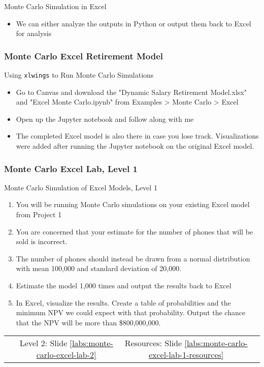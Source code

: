 \documentclass[handout, 11pt]{beamer}
\begin{document}
\begin{section}[Excel MC]{Monte Carlo Simulation in Excel}
\begin{frame}
\begin{itemize}
\item We can either analyze the outputs in Python or output them back to Excel for analysis
\end{itemize}
\end{frame}
\begin{frame}
\frametitle{Monte Carlo Excel Retirement Model}
{
\begin{block}{Using \texttt{xlwings} to Run Monte Carlo Simulations}
\begin{itemize}
\item Go to Canvas and download the "Dynamic Salary Retirement Model.xlsx" and "Excel Monte Carlo.ipynb" from Examples > Monte Carlo > Excel
\item Open up the Jupyter notebook and follow along with me
\item The completed Excel model is also there in case you lose track. Visualizations were added after running the Jupyter notebook on the original Excel model.
\end{itemize}
\end{block}
}
\end{frame}
\begin{frame}
\frametitle{Monte Carlo Excel Lab, Level 1}
{
\begin{block}{Monte Carlo Simulation of Excel Models, Level 1}
\begin{enumerate}
\item You will be running Monte Carlo simulations on your existing Excel model from Project 1
\item You are concerned that your estimate for the number of phones that will be sold is incorrect. 
\item The number of phones should instead be drawn from a normal distribution with mean 100,000 and standard deviation of 20,000.
\item Estimate the model 1,000 times and output the results back to Excel
\item In Excel, visualize the results.  Create a table of probabilities and the minimum NPV we could expect with that probability. Output the chance that the NPV will be more than \$800,000,000.
\end{enumerate}
\vfill
\begin{tabular*}{\textwidth}{@{\extracolsep{\fill}}cccc}
\toprule
\hfill & Level 2: Slide \textcolor{blue}{\underline{\ref{labs:monte-carlo-excel-lab-2}}} & Resources: Slide \textcolor{blue}{\underline{\ref{labs:monte-carlo-excel-lab-1-resources}}} & \hfill\\

\end{tabular*}
\end{block}
}
\label{labs:monte-carlo-excel-lab-1}
\end{frame}
\end{section}
\end{document}
